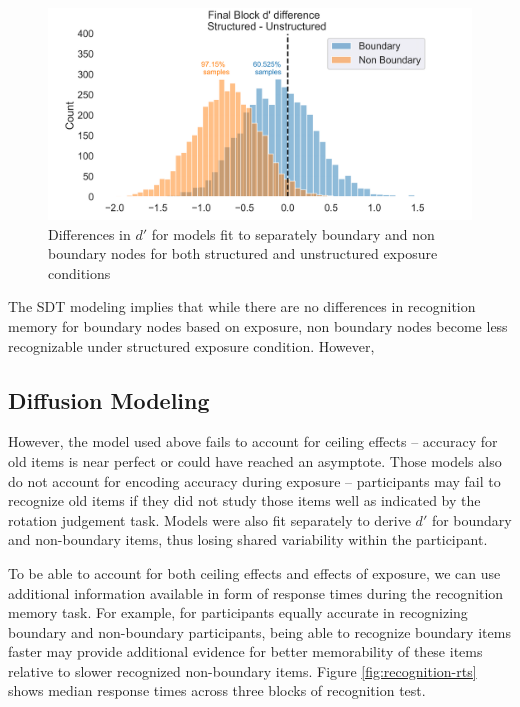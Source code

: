 \begin{figure}
    \centering
    \label{fig:sdt-params}
    \includegraphics[width = \textwidth]{chapter_notebooks/chapter_3/figures/sdt_d_results.png}
    \caption{Differences in $d'$ for models fit to separately boundary and non boundary nodes for both structured and unstructured exposure conditions}
\end{figure}

The SDT modeling implies that while there are no differences in recognition memory for boundary nodes based on exposure, non boundary nodes become less recognizable under structured exposure condition. However, 

\subsection*{Diffusion Modeling}
However, the model used above fails to account for ceiling effects -- accuracy for old items is near perfect or could have reached an asymptote. Those models also do not account for encoding accuracy during exposure -- participants may fail to recognize old items if they did not study those items well as indicated by the rotation judgement task. Models were also fit separately to derive $d'$ for boundary and non-boundary items, thus losing shared variability within the participant.

To be able to account for both ceiling effects and effects of exposure, we can use additional information available in form of response times during the recognition memory task. For example, for participants equally accurate in recognizing boundary and non-boundary participants, being able to recognize boundary items faster may provide additional evidence for better memorability of these items relative to slower recognized non-boundary items. Figure \ref{fig:recognition-rts} shows median response times across three blocks of recognition test. 

